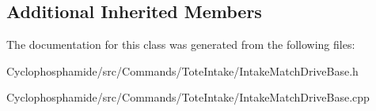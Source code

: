 \subsection*{Additional Inherited Members}


The documentation for this class was generated from the following files\+:\begin{DoxyCompactItemize}
\item 
Cyclophosphamide/src/\+Commands/\+Tote\+Intake/Intake\+Match\+Drive\+Base.\+h\item 
Cyclophosphamide/src/\+Commands/\+Tote\+Intake/Intake\+Match\+Drive\+Base.\+cpp\end{DoxyCompactItemize}
